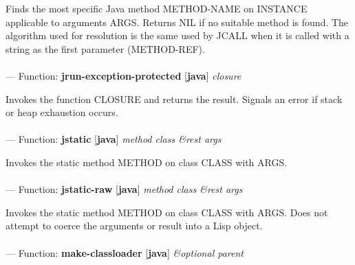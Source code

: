 \begin{adjustwidth}{5em}{5em}
Finds the most specific Java method METHOD-NAME on INSTANCE applicable to arguments ARGS. Returns NIL if no suitable method is found. The algorithm used for resolution is the same used by JCALL when it is called with a string as the first parameter (METHOD-REF).
\end{adjustwidth}

\paragraph{}
\label{JAVA:JRUN-EXCEPTION-PROTECTED}
--- Function: \textbf{jrun-exception-protected} [\textbf{java}] \textit{closure}

\begin{adjustwidth}{5em}{5em}
Invokes the function CLOSURE and returns the result.  Signals an error if stack or heap exhaustion occurs.
\end{adjustwidth}

\paragraph{}
\label{JAVA:JSTATIC}
--- Function: \textbf{jstatic} [\textbf{java}] \textit{method class \&rest args}

\begin{adjustwidth}{5em}{5em}
Invokes the static method METHOD on class CLASS with ARGS.
\end{adjustwidth}

\paragraph{}
\label{JAVA:JSTATIC-RAW}
--- Function: \textbf{jstatic-raw} [\textbf{java}] \textit{method class \&rest args}

\begin{adjustwidth}{5em}{5em}
Invokes the static method METHOD on class CLASS with ARGS. Does not attempt to coerce the arguments or result into a Lisp object.
\end{adjustwidth}

\paragraph{}
\label{JAVA:MAKE-CLASSLOADER}
--- Function: \textbf{make-classloader} [\textbf{java}] \textit{\&optional parent}

